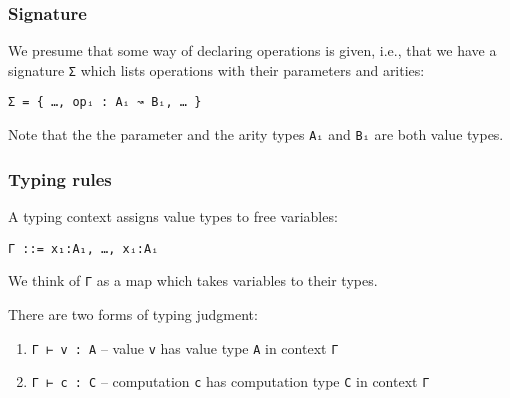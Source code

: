 \documentclass{article}
\begin{document}
\subsubsection{Signature}

We presume that some way of declaring operations is given, i.e., that we have a
signature \lstinline{Σ} which lists operations with their parameters and
arities:
%
\begin{lstlisting}
Σ = { …, opᵢ : Aᵢ ↝ Bᵢ, … }
\end{lstlisting}
%
Note that the the parameter and the arity types \lstinline{Aᵢ} and
\lstinline{Bᵢ} are both value types.

\subsubsection{Typing rules}

A typing context assigns value types to free variables:
%
\begin{lstlisting}
Γ ::= x₁:A₁, …, xᵢ:Aᵢ
\end{lstlisting}
%
We think of \lstinline{Γ} as a map which takes variables to their types.

There are two forms of typing judgment:
%
\begin{enumerate}
\item \lstinline{Γ ⊢ v : A} -- value \lstinline{v} has value type \lstinline{A} in context \lstinline{Γ}
\item \lstinline{Γ ⊢ c : C} -- computation \lstinline{c} has computation type \lstinline{C} in context \lstinline{Γ}
\end{enumerate}
\end{document}

